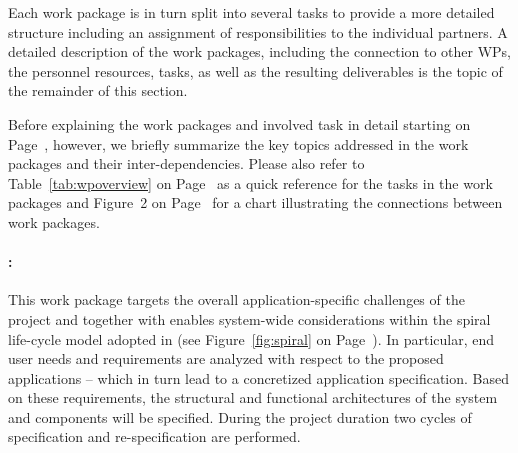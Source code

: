 Each work package is in turn split into several tasks to provide a more detailed structure including an assignment of responsibilities to the individual partners. A detailed description of the work packages, including the connection to other WPs, the personnel resources, tasks, as well as the resulting deliverables is the topic of the remainder of this section.

Before explaining the work packages and involved task in detail starting on Page~\pageref{wp1}, however, we briefly summarize the key topics addressed in the work packages and their inter-dependencies. Please also refer to  Table~\ref{tab:wpoverview} on Page~\pageref{tab:wpoverview} as a  quick reference for the tasks in the work packages and Figure~2 on Page~\pageref{fig:wpOverview} for a chart illustrating the connections between work packages. 



\paragraph{\textbf{\WPSpecification: \WPSpecificationTitle}} 
This work package targets the overall application-specific challenges of the project and together with \WPIntegration \space enables system-wide considerations within the spiral life-cycle model adopted in \Project (see Figure~\ref{fig:spiral} on Page~\pageref{fig:spiral}). In particular, end user needs and requirements are analyzed with respect to the proposed applications -- which in turn lead to a concretized application specification. Based on these requirements, the structural and functional architectures of the system and components will be specified. During the project duration two cycles of specification and re-specification are performed.



